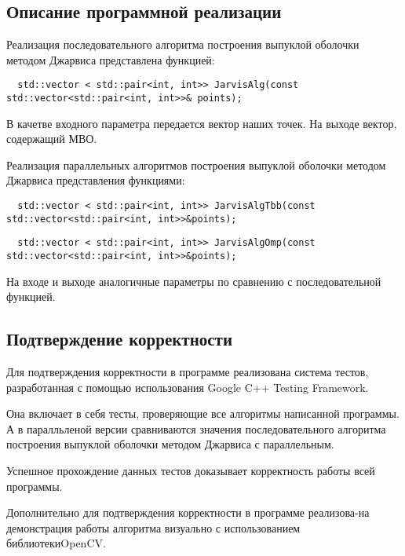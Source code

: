 \documentclass{report}
\begin{document}
\begin{center}
\section*{Описание программной реализации}
\end{center}
\par Реализация последовательного алгоритма построения выпуклой оболочки методом Джарвиса представлена функцией:
\begin{lstlisting}
  std::vector < std::pair<int, int>> JarvisAlg(const std::vector<std::pair<int, int>>& points);
\end{lstlisting}
В качетве входного параметра передается вектор наших точек. На выходе вектор, содержащий МВО.
\par Реализация параллельных алгоритмов построения выпуклой оболочки методом Джарвиса представления функциями:
\begin{lstlisting}
  std::vector < std::pair<int, int>> JarvisAlgTbb(const std::vector<std::pair<int, int>>&points);
\end{lstlisting}
\begin{lstlisting}
  std::vector < std::pair<int, int>> JarvisAlgOmp(const std::vector<std::pair<int, int>>&points);
\end{lstlisting}
На входе и выходе аналогичные параметры по сравнению с последовательной функцией.
\newpage

\begin{center}
\section*{Подтверждение корректности}
\end{center}
\par Для подтверждения корректности в программе реализована система тестов, разработанная с помощью использования Google C++ Testing Framework.
\par Она включает в себя тесты, проверяющие все алгоритмы написанной программы. А в паралльленой версии сравниваются значения последовательного алгоритма построения выпуклой оболочки методом Джарвиса с параллельным.
\par Успешное прохождение данных тестов доказывает корректность работы всей программы.
\par Дополнительно для подтверждения корректности в программе реализова-на демонстрация работы алгоритма визуально с использованием библиотекиOpenCV.
\newpage
\end{document}

